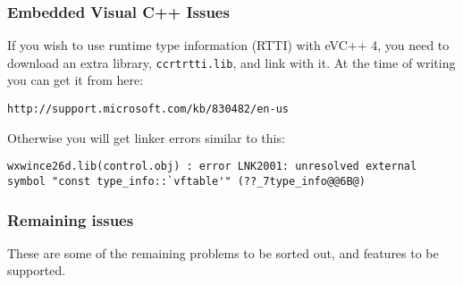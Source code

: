 \subsubsection{Embedded Visual C++ Issues}


If you wish to use runtime type information (RTTI) with eVC++ 4, you need to download
an extra library, {\tt ccrtrtti.lib}, and link with it. At the time of
writing you can get it from here:

\begin{verbatim}
http://support.microsoft.com/kb/830482/en-us
\end{verbatim}

Otherwise you will get linker errors similar to this:

\begin{verbatim}
wxwince26d.lib(control.obj) : error LNK2001: unresolved external symbol "const type_info::`vftable'" (??_7type_info@@6B@)
\end{verbatim}

\subsubsection{Remaining issues}

These are some of the remaining problems to be sorted out, and features
to be supported.


